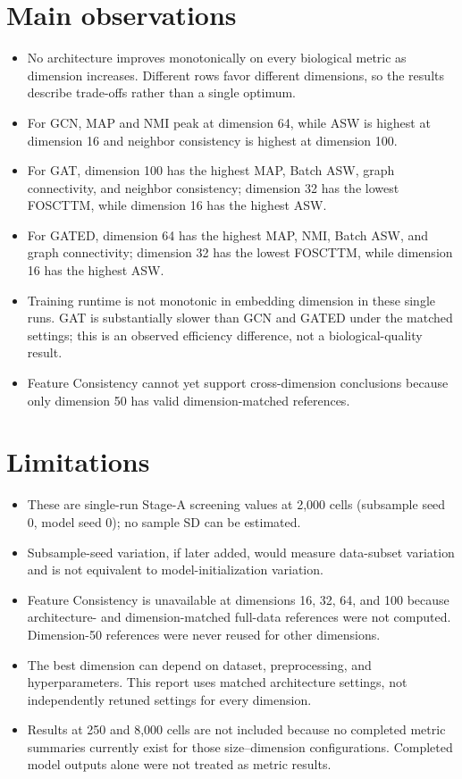 \documentclass[10pt]{article}
\begin{document}
\section{Main observations}
\begin{itemize}
\item No architecture improves monotonically on every biological metric as dimension increases. Different rows favor different dimensions, so the results describe trade-offs rather than a single optimum.
\item For GCN, MAP and NMI peak at dimension 64, while ASW is highest at dimension 16 and neighbor consistency is highest at dimension 100.
\item For GAT, dimension 100 has the highest MAP, Batch ASW, graph connectivity, and neighbor consistency; dimension 32 has the lowest FOSCTTM, while dimension 16 has the highest ASW.
\item For GATED, dimension 64 has the highest MAP, NMI, Batch ASW, and graph connectivity; dimension 32 has the lowest FOSCTTM, while dimension 16 has the highest ASW.
\item Training runtime is not monotonic in embedding dimension in these single runs. GAT is substantially slower than GCN and GATED under the matched settings; this is an observed efficiency difference, not a biological-quality result.
\item Feature Consistency cannot yet support cross-dimension conclusions because only dimension 50 has valid dimension-matched references.
\end{itemize}

\section{Limitations}
\begin{itemize}
\item These are single-run Stage-A screening values at 2,000 cells (subsample seed 0, model seed 0); no sample SD can be estimated.
\item Subsample-seed variation, if later added, would measure data-subset variation and is not equivalent to model-initialization variation.
\item Feature Consistency is unavailable at dimensions 16, 32, 64, and 100 because architecture- and dimension-matched full-data references were not computed. Dimension-50 references were never reused for other dimensions.
\item The best dimension can depend on dataset, preprocessing, and hyperparameters. This report uses matched architecture settings, not independently retuned settings for every dimension.
\item Results at 250 and 8,000 cells are not included because no completed metric summaries currently exist for those size--dimension configurations. Completed model outputs alone were not treated as metric results.
\end{itemize}
\end{document}
